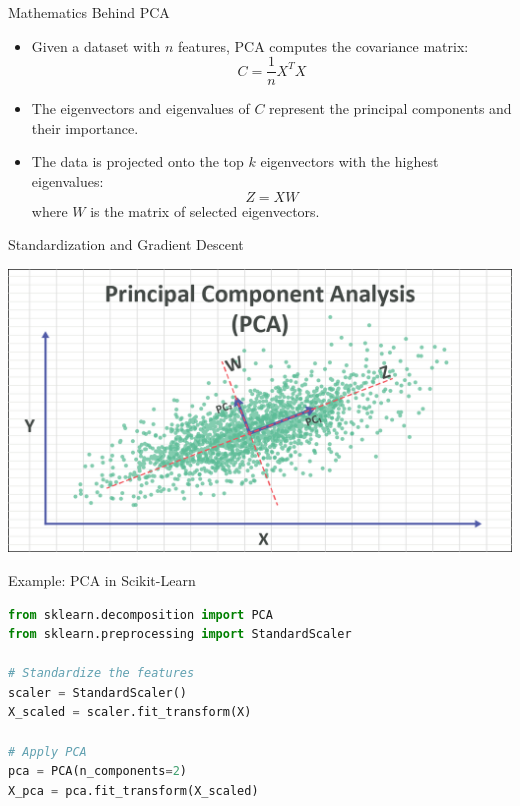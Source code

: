 \documentclass[11pt]{beamer}
\begin{document}
\begin{frame}{Mathematics Behind PCA}
    \begin{itemize}
        \item Given a dataset with $n$ features, PCA computes the covariance matrix:
        \begin{equation}
        C = \frac{1}{n} X^T X
        \end{equation}
        \item The eigenvectors and eigenvalues of $C$ represent the principal components and their importance.
        \item The data is projected onto the top $k$ eigenvectors with the highest eigenvalues:
        \begin{equation}
        Z = X W
        \end{equation}
        where $W$ is the matrix of selected eigenvectors.
    \end{itemize}
\end{frame}
\begin{frame}{Standardization and Gradient Descent}
	\begin{center}
	\includegraphics[scale=.375]{../05-pictures/lesson-2-2_pic_6.png}
	\end{center}
\end{frame}
\begin{frame}[fragile]{Example: PCA in Scikit-Learn}
    \begin{lstlisting}[language=Python]
from sklearn.decomposition import PCA
from sklearn.preprocessing import StandardScaler

# Standardize the features
scaler = StandardScaler()
X_scaled = scaler.fit_transform(X)

# Apply PCA
pca = PCA(n_components=2)
X_pca = pca.fit_transform(X_scaled)
    \end{lstlisting}
\end{frame}
\end{document}
